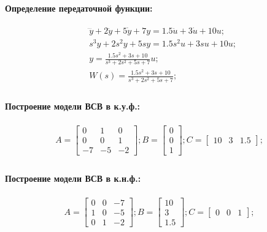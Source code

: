 \paragraph{Определение передаточной функции:}
\begin{equation}
	\begin{split}	
&\dddot{y} + 2\ddot{y} + 5\dot{y} + 7y = 1.5\ddot{u} + 3\dot{u} + 10u;\\
&s^3y + 2s^2y + 5sy = 1.5s^2u + 3su + 10u;\\
&y=\frac{1.5s^2+3s+10}{s^3+2s^2+5s+7}u;\\
&W(s)=\frac{1.5s^2+3s+10}{s^3+2s^2+5s+7};\\
	\end{split}
\end{equation}
\paragraph{Построение модели ВСВ в к.у.ф.:}
\begin{equation}
	\begin{split}	
A = \begin{bmatrix}
				0 & 1 & 0\\
				0 & 0 & 1\\
				-7 & -5 & -2
				\end{bmatrix}; B = \begin{bmatrix}
				0\\
				0\\
				1
				\end{bmatrix}; C = \begin{bmatrix}
				10 & 3 & 1.5
				\end{bmatrix};\\
	\end{split}
\end{equation}
\paragraph{Построение модели ВСВ в к.н.ф.:}
\begin{equation}
	\begin{split}	
A = \begin{bmatrix}
				0 & 0 & -7\\
				1 & 0 & -5\\
				0 & 1 & -2
				\end{bmatrix}; B = \begin{bmatrix}
				10\\
				3\\
				1.5
				\end{bmatrix}; C = \begin{bmatrix}
				0 & 0 & 1
				\end{bmatrix};\\
	\end{split}
\end{equation}

